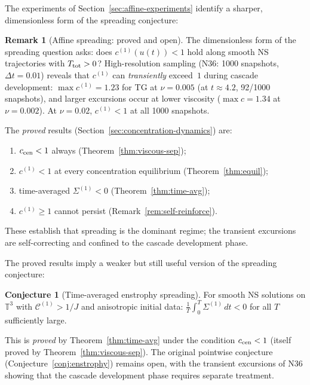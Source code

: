 \documentclass[11pt]{article}
\theoremstyle{definition}
\newtheorem{remark}[theorem]{Remark}
\newtheorem{conjecture}[theorem]{Conjecture}
\newcommand{\T}{\mathbb{T}}
\newcommand{\cC}{\mathcal{C}}
\begin{document}
The experiments of Section~\ref{sec:affine-experiments}
identify a sharper, dimensionless form of the
spreading conjecture:

\begin{remark}[Affine spreading: proved and open]
\label{conj:affine}
The dimensionless form of the spreading question
asks: does $c^{(1)}(u(t))<1$ hold along smooth
NS trajectories with $T_{\rm tot}>0$?
High-resolution sampling (N36: 1000 snapshots,
$\Delta t=0.01$) reveals that $c^{(1)}$ can
\emph{transiently} exceed~$1$ during cascade
development: $\max c^{(1)} = 1.23$ for TG at
$\nu=0.005$ (at $t\approx 4.2$, 92/1000 snapshots),
and larger excursions occur at lower viscosity
($\max c = 1.34$ at $\nu=0.002$).  At $\nu=0.02$,
$c^{(1)}<1$ at all 1000 snapshots.

The \emph{proved} results
(Section~\ref{sec:concentration-dynamics}) are:
\begin{enumerate}[nosep,leftmargin=2em]
\item $c_{\rm cen}<1$ always
  (Theorem~\ref{thm:viscous-sep});
\item $c^{(1)}<1$ at every concentration
  equilibrium (Theorem~\ref{thm:equil});
\item time-averaged $\Sigma^{(1)}<0$
  (Theorem~\ref{thm:time-avg});
\item $c^{(1)}\geq 1$ cannot persist
  (Remark~\ref{rem:self-reinforce}).
\end{enumerate}
These establish that spreading is the dominant
regime; the transient excursions are self-correcting
and confined to the cascade development phase.
\end{remark}

The proved results imply a weaker but still
useful version of the spreading conjecture:

\begin{conjecture}[Time-averaged enstrophy spreading]
\label{conj:time-avg}
For smooth NS solutions on $\T^3$ with
$\cC^{(1)}>1/J$ and anisotropic initial data:
$\frac{1}{T}\int_0^T\Sigma^{(1)}\,dt < 0$
for all $T$ sufficiently large.
\end{conjecture}

This is \emph{proved} by Theorem~\ref{thm:time-avg}
under the condition $c_{\rm cen}<1$
(itself proved by Theorem~\ref{thm:viscous-sep}).
The original pointwise conjecture
(Conjecture~\ref{conj:enstrophy}) remains open,
with the transient excursions of N36 showing that
the cascade development phase requires separate
treatment.
\end{document}
